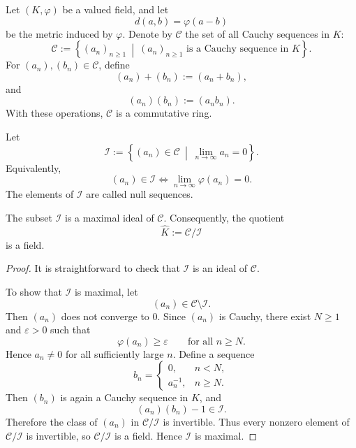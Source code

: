 \begin{definition}
    Let \((K,\varphi)\) be a valued field, and let
    \[
        d(a,b)=\varphi(a-b)
    \]
    be the metric induced by \(\varphi\). Denote by \(\mathcal{C}\) the set of all
    Cauchy sequences in \(K\):
    \[
        \mathcal{C}
        :=
        \left\{
            (a_n)_{n\geq 1}
            \ \middle|\
            (a_n)_{n\geq 1}\text{ is a Cauchy sequence in }K
        \right\}.
    \]
    For \((a_n),(b_n)\in \mathcal{C}\), define
    \[
        (a_n)+(b_n):=(a_n+b_n),
    \]
    and
    \[
        (a_n)(b_n):=(a_nb_n).
    \]
    With these operations, \(\mathcal{C}\) is a commutative ring.
\end{definition}

\begin{definition}
    Let
    \[
        \mathcal{I}
        :=
        \left\{
            (a_n)\in \mathcal{C}
            \ \middle|\
            \lim_{n\to\infty} a_n=0
        \right\}.
    \]
    Equivalently,
    \[
        (a_n)\in \mathcal{I}
        \Longleftrightarrow
        \lim_{n\to\infty}\varphi(a_n)=0.
    \]
    The elements of \(\mathcal{I}\) are called null sequences.
\end{definition}

\begin{proposition}
    The subset \(\mathcal{I}\) is a maximal ideal of \(\mathcal{C}\). Consequently,
    the quotient
    \[
        \widehat{K}:=\mathcal{C}/\mathcal{I}
    \]
    is a field.
\end{proposition}

\begin{proof}
    It is straightforward to check that \(\mathcal{I}\) is an ideal of
    \(\mathcal{C}\).

    To show that \(\mathcal{I}\) is maximal, let
    \[
        (a_n)\in \mathcal{C}\setminus \mathcal{I}.
    \]
    Then \((a_n)\) does not converge to \(0\). Since \((a_n)\) is Cauchy, there exist
    \(N\geq 1\) and \(\varepsilon>0\) such that
    \[
        \varphi(a_n)\geq \varepsilon
        \qquad
        \text{for all } n\geq N.
    \]
    Hence \(a_n\neq 0\) for all sufficiently large \(n\). Define a sequence
    \[
        b_n=
        \begin{cases}
            0, & n<N,\\
            a_n^{-1}, & n\geq N.
        \end{cases}
    \]
    Then \((b_n)\) is again a Cauchy sequence in \(K\), and
    \[
        (a_n)(b_n)-1\in \mathcal{I}.
    \]
    Therefore the class of \((a_n)\) in \(\mathcal{C}/\mathcal{I}\) is invertible.
    Thus every nonzero element of \(\mathcal{C}/\mathcal{I}\) is invertible, so
    \(\mathcal{C}/\mathcal{I}\) is a field. Hence \(\mathcal{I}\) is maximal.
\end{proof}

